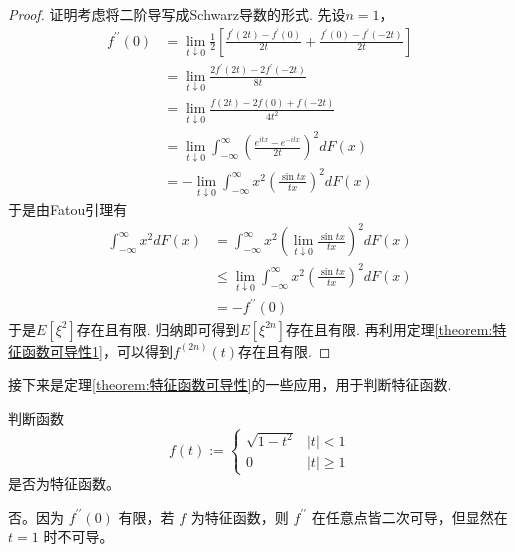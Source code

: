 \begin{proof}
    证明考虑将二阶导写成Schwarz导数的形式. 先设$n=1$，
    \begin{align*}
        f^{\prime \prime}(0) & =\lim _{t \downarrow 0} \frac{1}{2}\left[\frac{f^{\prime}(2 t)-f^{\prime}(0)}{2 t}+\frac{f^{\prime}(0)-f^{\prime}(-2 t)}{2 t}\right] \\
                             & =\lim _{t \downarrow 0} \frac{2 f^{\prime}(2 t)-2 f^{\prime}(-2 t)}{8 t}                                                             \\
                             & =\lim _{t \downarrow 0} \frac{f(2 t)-2 f(0)+f(-2 t)}{4 t^2}                                                                          \\
                             & =\lim _{t \downarrow 0} \int_{-\infty}^{\infty}\left(\frac{e^{i t x}-e^{-i t x}}{2 t}\right)^2 d F(x)                                \\
                             & =-\lim _{t \downarrow 0} \int_{-\infty}^{\infty} x^2\left(\frac{\sin t x}{t x}\right)^2 d F(x)
    \end{align*}
    于是由Fatou引理有
    \begin{align*}
        \int_{-\infty}^{\infty} x^2 d F(x) & =\int_{-\infty}^{\infty} x^2\left(\lim _{t \downarrow 0} \frac{\sin t x}{t x}\right)^2 d F(x)          \\
                                           & \leqslant \lim _{t \downarrow 0} \int_{-\infty}^{\infty} x^2\left(\frac{\sin t x}{t x}\right)^2 d F(x) \\
                                           & =-f^{\prime \prime}(0)
    \end{align*}
    于是$E[\xi^2]$存在且有限. 归纳即可得到$E[\xi^{2n}]$存在且有限. 再利用定理\ref{theorem:特征函数可导性1}，可以得到$f^{(2n)}(t)$存在且有限.
\end{proof}
接下来是定理\ref{theorem:特征函数可导性}的一些应用，用于判断特征函数.
\begin{example}
    判断函数
    $$
        f(t):= \begin{cases}\sqrt{1-t^2} & |t|<1 \\ 0 & |t| \geqslant 1\end{cases}
    $$
    是否为特征函数。
\end{example}
\begin{solution}
    否。因为 $f^{\prime \prime}(0)$ 有限，若 $f$ 为特征函数，则 $f^{\prime \prime}$ 在任意点皆二次可导，但显然在 $t=1$ 时不可导。
\end{solution}
